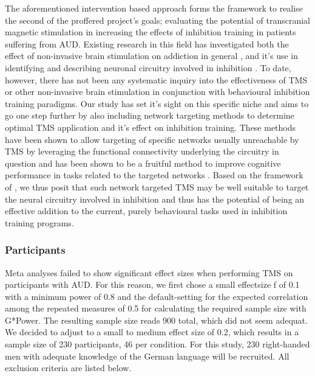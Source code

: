 \documentclass[12pt]{article}
\begin{document}
The aforementioned intervention based approach forms the framework to realise the second of the proffered project's goals; evaluating the potential of transcranial magnetic stimulation in increasing the effects of inhibition training in patients suffering from AUD. Existing research in this field has investigated both the effect of non-invasive brain stimulation on addiction in general \parencite{antonelliTranscranialMagneticStimulation2021,mostafaviNoninvasiveBrainStimulation2020,zhangEffectsRepetitiveTranscranial2019}, and it's use in identifying and describing neuronal circuitry involved in inhibition \parencite{naim-feilCorticalInhibitionMotor2016,quoilinNeuralBasesInhibitory2021}. To date, however, there has not been any systematic inquiry into the effectiveness of TMS or other non-invasive brain stimulation in conjunction with behavioural inhibition training paradigms. Our study has set it's sight on this specific niche and aims to go one step further by also including network targeting methods to determine optimal TMS application and it's effect on inhibition training. These methods have been shown to allow targeting of specific networks usually unreachable by TMS by leveraging the functional connectivity underlying the circuitry in question and has been shown to be a fruitful method to improve cognitive performance in tasks related to the targeted networks \parencite{momiCognitiveEnhancementNetworkTargeted2020}. Based on the framework of \textcite{volkowAddictionScienceUncovering2014}, we thus posit that such network targeted TMS may be well suitable to target the neural circuitry involved in inhibition and thus has the potential of being an effective addition to the current, purely behavioural tasks used in inhibition training programs.

\subsubsection{Participants}

Meta analyses failed to show significant effect sizes when performing TMS on participants with AUD. For this reason, we first chose a small effectsize f of 0.1 with a minimum power of 0.8 and the default-setting for the expected correlation among the repeated measures of 0.5 for calculating the required sample size with G*Power. The resulting sample size reads 900 total, which did not seem adequat. We decided to adjust to a small to medium effect size of 0.2, which results in a sample size of 230 participants, 46 per condition. 
For this study, 230 right-handed men with adequate knowledge of the German language will be recruited. All exclusion criteria are listed below. 
\end{document}
